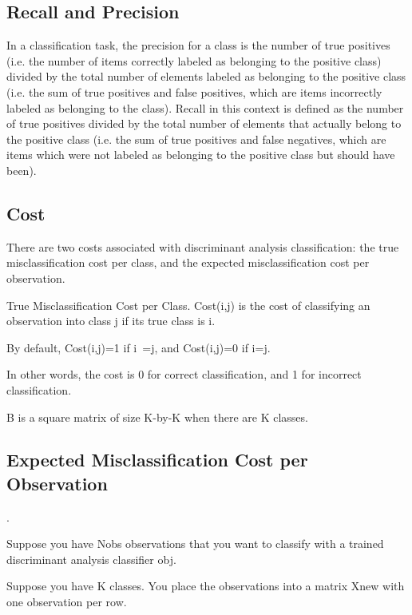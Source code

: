 
\subsection{Recall and Precision}

In a classification task, the precision for a class is the number of true positives (i.e. the number of items correctly labeled as belonging to the positive class) divided by the total number of elements labeled as belonging to the positive class (i.e. the sum of true positives and false positives, which are items incorrectly labeled as belonging to the class). Recall in this context is defined as the number of true positives divided by the total number of elements that actually belong to the positive class (i.e. the sum of true positives and false negatives, which are items which were not labeled as belonging to the positive class but should have been).

\subsection*{Cost}

There are two costs associated with discriminant analysis classification: the true misclassification cost per class, and the expected misclassification cost per observation.

True Misclassification Cost per Class.  Cost(i,j) is the cost of classifying an observation into class j if its true class is i. 

By default, Cost(i,j)=1 if i~=j, and Cost(i,j)=0 if i=j. 

In other words, the cost is 0 for correct classification, and 1 for incorrect classification.

B is a square matrix of size K-by-K when there are K classes. 

\subsection{Expected Misclassification Cost per Observation}.  

Suppose you have Nobs observations that you want to classify with a trained discriminant analysis classifier obj. 

Suppose you have K classes. You place the observations into a matrix Xnew with one observation per row. 

